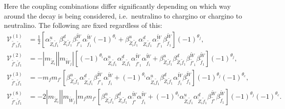 \documentclass[final,3p,times]{elsarticle}
\begin{document}
Here the coupling combinations differ significantly depending on which way around the decay is being considered, i.e.\ neutralino to chargino or chargino to neutralino. The following are fixed regardless of this:
\begin{align}
\mathcal{V}_{\tilde{f'}_1 \tilde{f}_1}^{(1)} &= \frac{1}{2}\left[\alpha_{\tilde{Z}_i \tilde{f}_1}^{u} \beta_{\tilde{Z}_i \tilde{f}_1}^{d} \beta_{\tilde{f'}_1}^{\tilde{W}}\alpha_{\tilde{f}_1}^{\tilde{W}}(-1)^{\theta_i} + \beta_{\tilde{Z}_i \tilde{f}_1}^{u} \alpha_{\tilde{Z}_i \tilde{f}_1}^{d} \alpha_{\tilde{f'}_1}^{\tilde{W}} \beta_{\tilde{f}_1}^{\tilde{W}}\right](-1)^{\theta_j}, \\
\mathcal{V}_{\tilde{f'}_1 \tilde{f}_1}^{(2)} &= -|m_{\tilde{Z}_i}||m_{\tilde{W}_j}|\left[(-1)^{\theta_i} \alpha_{\tilde{Z}_i \tilde{f}_1}^{u} \alpha_{\tilde{Z}_i \tilde{f}_1}^{d} \alpha_{\tilde{f'}_1}^{\tilde{W}} \alpha_{\tilde{f}_1}^{\tilde{W}} + \beta_{\tilde{Z}_i \tilde{f}_1}^{u} \beta_{\tilde{Z}_{i} \tilde{f}_1}^{d} \beta_{\tilde{f'}_1}^{\tilde{W}} \beta_{\tilde{f}_1}^{\tilde{W}}\right](-1)^{\theta_j}, \\
\mathcal{V}_{\tilde{f'}_1 \tilde{f}_1}^{(3)} &= -m_{f}m_{f'}\left[\beta_{\tilde{Z}_i \tilde{f}_1}^{u} \alpha_{\tilde{Z}_i \tilde{f}_1}^{d} \beta_{\tilde{f'}_1}^{\tilde{W}} \alpha_{\tilde{f}_1}^{\tilde{W}} + (-1)^{\theta_i} \alpha_{\tilde{Z}_i \tilde{f}_1}^{u} \beta_{\tilde{Z}_i \tilde{f}_1}^{d} \alpha_{\tilde{f}_1}^{\tilde{W}} \beta_{\tilde{f}_1}^{\tilde{W}}\right](-1)^{\theta_j}(-1)^{\theta_c}  , \\
\mathcal{V}_{\tilde{f'}_1 \tilde{f}_1}^{(8)} &= -2|m_{\tilde{Z}_i}||m_{\tilde{W}_j}|m_{f} m_{f'} \left[\beta_{\tilde{Z}_i \tilde{f}_1}^{u}\beta_{\tilde{Z}_i \tilde{f}_1}^{d} \alpha_{\tilde{f'}}^{\tilde{W}} \alpha_{\tilde{f}_1}^{\tilde{W}} + (-1)^{\theta_i}\alpha_{\tilde{Z}_i \tilde{f}_1}^{u} \alpha_{\tilde{Z}_i \tilde{f}_1}^{d} \beta_{\tilde{f'}}^{\tilde{W}} \beta_{\tilde{f}_1}^{\tilde{W}}\right] (-1)^{\theta_j}(-1)^{\theta_c}.
\end{align}
\end{document}
